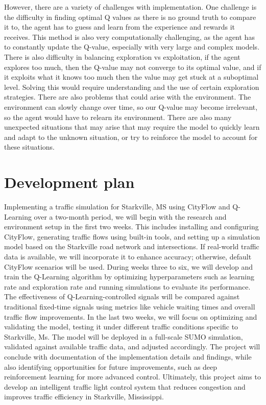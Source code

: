 \documentclass[conference]{IEEEtran}
\begin{document}
However, there are a variety of challenges with implementation. One challenge is the difficulty in finding optimal Q values as there is no ground truth to compare it to, the agent has to guess and learn from the experience and rewards it receives. This method is also very computationally challenging, as the agent has to constantly update the Q-value, especially with very large and complex models. There is also difficulty in balancing exploration vs exploitation, if the agent explores too much, then the Q-value may not converge to its optimal value, and if it exploits what it knows too much then the value may get stuck at a suboptimal level. Solving this would require understanding and the use of certain exploration strategies. There are also problems that could arise with the environment. The environment can slowly change over time, so our Q-value may become irrelevant, so the agent would have to relearn its environment. There are also many unexpected situations that may arise that may require the model to quickly learn and adapt to the unknown situation, or try to reinforce the model to account for these situations.

\section{Development plan}

Implementing a traffic simulation for Starkville, MS using CityFlow and Q-Learning over a two-month period, we will begin with the research and environment setup in the first two weeks. This includes installing and configuring CityFlow, generating traffic flows using built-in tools, and setting up a simulation model based on the Starkville road network and intersections. If real-world traffic data is available, we will incorporate it to enhance accuracy; otherwise, default CityFlow scenarios will be used. During weeks three to six, we will develop and train the Q-Learning algorithm by optimizing hyperparameters such as learning rate and exploration rate and running simulations to evaluate its performance. The effectiveness of Q-Learning-controlled signals will be compared against traditional fixed-time signals using metrics like vehicle waiting times and overall traffic flow improvements. In the last two weeks, we will focus on optimizing and validating the model, testing it under different traffic conditions specific to Starkville, Ms. The model will be deployed in a full-scale SUMO simulation, validated against available traffic data, and adjusted accordingly. The project will conclude with documentation of the implementation details and findings, while also identifying opportunities for future improvements, such as deep reinforcement learning for more advanced control. Ultimately, this project aims to develop an intelligent traffic light control system that reduces congestion and improves traffic efficiency in Starkville, Mississippi.
\end{document}
